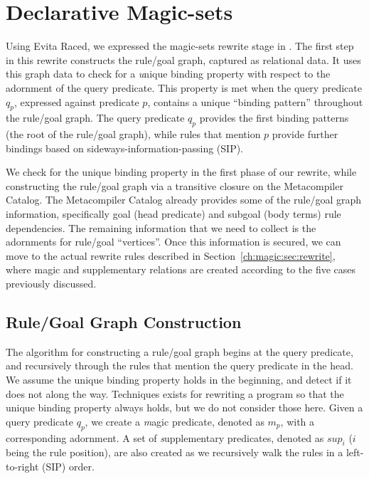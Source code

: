 \section{Declarative Magic-sets}
\label{ch:magic:sec:rules}

Using Evita Raced, we expressed the magic-sets rewrite stage in \OVERLOG.  The
first step in this rewrite constructs the rule/goal graph, captured as
relational data.  It uses this graph data to check for a {\emph unique binding
property} with respect to the adornment of the query predicate.  This property
is met when the query predicate $q_p$, expressed against predicate $p$,
contains a unique ``binding pattern'' throughout the rule/goal graph.  The
query predicate $q_p$ provides the first binding patterns (the root of the
rule/goal graph), while rules that mention $p$ provide further bindings based
on sideways-information-passing (SIP).

We check for the unique binding property in the first phase of our rewrite,
while constructing the rule/goal graph via a transitive closure on the
Metacompiler Catalog.  The Metacompiler Catalog already provides some of the
rule/goal graph information, specifically goal (head predicate) and subgoal
(body terms) rule dependencies.  The remaining information that we need to
collect is the adornments for rule/goal ``vertices''.  Once this information is
secured, we can move to the actual rewrite rules described in
Section~\ref{ch:magic:sec:rewrite}, where magic and supplementary relations are
created according to the five cases previously discussed.

\subsection{Rule/Goal Graph Construction}
\label{ch:magic:sec:rgconstruct}

The algorithm for constructing a rule/goal graph begins at the query predicate,
and recursively through the rules that mention the query predicate in the head.
We assume the unique binding property holds in the beginning, and detect if it
does not along the way.  Techniques exists for rewriting a program so that the
unique binding property always holds, but we do not consider those here.  Given
a query predicate $q_p$, we create a {\emph magic predicate}, denoted as $m_p$,
with a corresponding adornment.  A set of {\emph supplementary predicates},
denoted as $sup_i$ ($i$ being the rule position), are also created as we
recursively walk the rules in a left-to-right (SIP) order.


